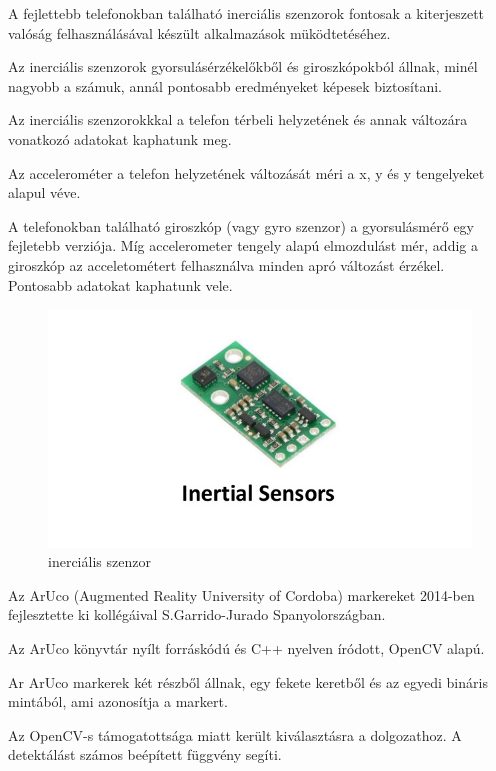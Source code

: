 
A fejlettebb telefonokban található inerciális szenzorok fontosak a kiterjeszett valóság felhasználásával készült alkalmazások müködtetéséhez.  

Az inerciális szenzorok gyorsulásérzékelőkből és giroszkópokból állnak, minél nagyobb a számuk, annál pontosabb eredményeket képesek biztosítani.

Az inerciális szenzorokkkal a telefon térbeli helyzetének és annak változára vonatkozó adatokat kaphatunk meg.

Az accelerométer a telefon helyzetének változását méri a x, y és y tengelyeket alapul véve. 

A telefonokban található giroszkóp (vagy gyro szenzor) a gyorsulásmérő egy fejletebb verziója.
Míg accelerometer tengely alapú elmozdulást mér, addig a giroszkóp az acceletométert felhasználva minden apró változást érzékel. Pontosabb adatokat kaphatunk vele.

\begin{figure}[htp]
    \centering
   	\includegraphics[width=3truecm, height=2truecm]{images/inertial.jpg}
	\caption{inerciális szenzor}
\end{figure}



Az ArUco (Augmented Reality University of Cordoba) markereket 2014-ben fejlesztette ki kollégáival S.Garrido-Jurado Spanyolországban. 

Az ArUco könyvtár nyílt forráskódú és C++ nyelven íródott, OpenCV alapú. 

Ar ArUco markerek két részből állnak, egy fekete keretből és az egyedi bináris mintából, ami azonosítja a markert. 

Az OpenCV-s támogatottsága miatt került kiválasztásra a dolgozathoz. A detektálást számos beépített függvény segíti.\\

